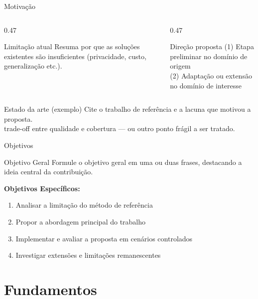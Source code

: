 \documentclass[aspectratio=169, 10pt, brazil]{beamer}
\begin{document}
\begin{frame}{Motivação}
  \begin{columns}[T]
    \begin{column}{0.47\textwidth}
      \begin{alerta}{Limitação atual}
        Resuma por que as soluções existentes são insuficientes
        (privacidade, custo, generalização etc.).
      \end{alerta}
    \end{column}
    \begin{column}{0.47\textwidth}
      \begin{destaque}{Direção proposta}
        (1) Etapa preliminar no domínio de origem\\
        (2) Adaptação ou extensão no domínio de interesse
      \end{destaque}
    \end{column}
  \end{columns}
  \vspace{0.4em}
  \begin{block}{Estado da arte (exemplo)}
    Cite o trabalho de referência e a lacuna que motivou a proposta.\\[0.3em]
     trade-off entre qualidade e cobertura —
    ou outro ponto frágil a ser tratado.
  \end{block}
\end{frame}

\begin{frame}{Objetivos}
  \begin{block}{Objetivo Geral}
    Formule o objetivo geral em uma ou duas frases, destacando a
    ideia central da contribuição.
  \end{block}
  \vspace{0.5em}
  \textbf{Objetivos Específicos:}
  \begin{enumerate}
    \item Analisar a limitação do método de referência
    \item Propor a abordagem principal do trabalho
    \item Implementar e avaliar a proposta em cenários controlados
    \item Investigar extensões e limitações remanescentes
  \end{enumerate}
\end{frame}

\section{Fundamentos}
\end{document}
